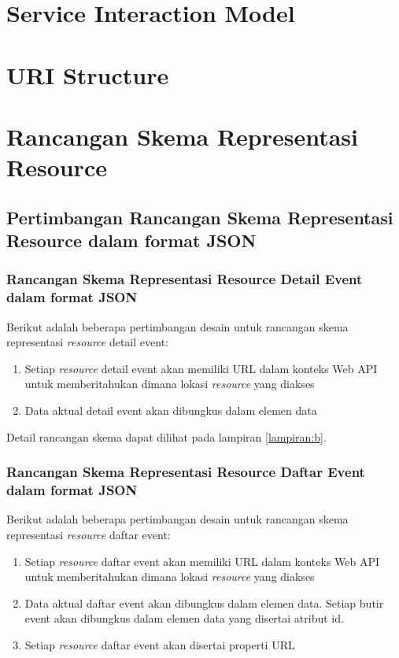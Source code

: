 \documentclass[a4paper, 12pt, oneside]{report}
\begin{document}
\section{Service Interaction Model}

\section{URI Structure}

\section{Rancangan Skema Representasi Resource}

\subsection{Pertimbangan Rancangan Skema Representasi Resource dalam format JSON}

\subsubsection{Rancangan Skema Representasi Resource Detail Event dalam format JSON}

\onehalfspacing Berikut adalah beberapa pertimbangan desain untuk rancangan skema representasi \textit{resource} detail event:

\begin{enumerate}
  \item Setiap \textit{resource} detail event akan memiliki URL dalam konteks Web API untuk memberitahukan dimana lokasi \textit{resource} yang diakses
  \item Data aktual detail event akan dibungkus dalam elemen data
\end{enumerate}

Detail rancangan skema dapat dilihat pada lampiran \ref{lampiran:b}.

\subsubsection{Rancangan Skema Representasi Resource Daftar Event dalam format JSON}

\onehalfspacing Berikut adalah beberapa pertimbangan desain untuk rancangan skema representasi \textit{resource} daftar event:

\begin{enumerate}
  \item Setiap \textit{resource} daftar event akan memiliki URL dalam konteks Web API untuk memberitahukan dimana lokasi \textit{resource} yang diakses
  \item Data aktual daftar event akan dibungkus dalam elemen data. Setiap butir event akan dibungkus dalam elemen data yang disertai atribut id.
\item Setiap \textit{resource} daftar event akan disertai properti URL
\end{enumerate}
\end{document}
